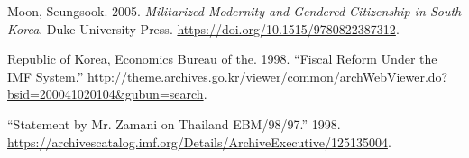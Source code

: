 \begin{CSLReferences}{1}{0}
\leavevmode{}%
Moon, Seungsook. 2005. \emph{Militarized {Modernity} and {Gendered
Citizenship} in {South Korea}}. {Duke University Press}.
\url{https://doi.org/10.1515/9780822387312}.

\leavevmode{}%
Republic of Korea, Economics Bureau of the. 1998. {``Fiscal Reform Under
the {IMF} System.''}
\url{http://theme.archives.go.kr/viewer/common/archWebViewer.do?bsid=200041020104\&gubun=search}.

\leavevmode{}%
{``Statement by {Mr}. {Zamani} on {Thailand} {EBM}/98/97.''} 1998.
\url{https://archivescatalog.imf.org/Details/ArchiveExecutive/125135004}.

\end{CSLReferences}
